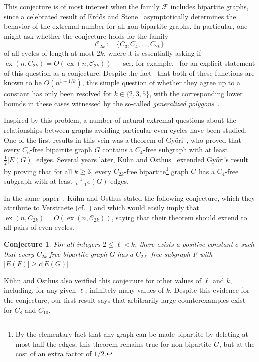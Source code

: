 \documentclass[A4paper,reqno,oneside,11pt]{amsart}
\theoremstyle{plain}
\newtheorem{conjecture}[theorem]{Conjecture}
\theoremstyle{definition}
\newcommand{\scC}{\mathscr{C}}
\newcommand{\scF}{\mathscr{F}}
\newcommand{\ex}{\operatorname{ex}}
\def\l{\ell}
\begin{document}
This conjecture is of most interest when the family $\scF$ includes bipartite graphs, since a celebrated result of Erd\H{o}s and Stone~\cite{ES46} asymptotically determines the behavior of the extremal number for all non-bipartite graphs. In particular, one might ask whether the conjecture holds for the family 
\begin{equation*}
    \scC_{2k} := \{C_3, C_4, \dots, C_{2k}\}
\end{equation*}
of all cycles of length at most $2k$, where it is essentially asking if $\ex(n, C_{2k}) = O(\ex(n, \scC_{2k}))$ --- see, for example,~\cite[Conjecture IV]{Verstraete} for an explicit statement of this question as a conjecture. Despite the fact~\cite{BS74} that both of these functions are known to be $O(n^{1 + 1/k})$, this simple question of whether they agree up to a constant has only been resolved for $k \in \{2,3,5\}$, with the corresponding lower bounds in these cases witnessed by the so-called {\it generalized polygons}~\cite{LUW99}.

Inspired by this problem, a number of natural extremal questions about the relationships between graphs avoiding particular even cycles have been studied. 
One of the first results in this vein was a theorem of Gy\H{o}ri~\cite{Gyori}, who proved that every $C_6$-free bipartite graph $G$ contains a $C_4$-free subgraph with at least $\frac 12 |E(G)|$ edges. 
Several years later, K\"uhn and Osthus~\cite{KO05} extended Gy\H{o}ri's result by proving that for all $k \geq 3$, every $C_{2k}$-free bipartite\footnote{By the elementary fact that any graph can be made bipartite by deleting at most half the edges, this theorem remains true for  non-bipartite $G$, but at the cost of an extra factor of $1/2$.} graph $G$ has a $C_4$-free subgraph with at least $\frac{1}{k-1} e(G)$ edges.

In the same paper~\cite{KO05}, K\"uhn and Osthus stated the following conjecture, which they attribute to Verstra\"ete (cf.~\cite[Conjecture VIII]{Verstraete}) and which would easily imply that $\ex(n, C_{2k}) = O(\ex(n, \scC_{2k}))$, 
saying that their theorem should extend to all pairs of even cycles.

\begin{conjecture}
\label{conj: main}
    For all integers $2 \leq \l< k$, there exists a positive constant $c$ such that every $C_{2k}$-free bipartite graph $G$ has a $C_{2\l}$-free subgraph $F$ with $|E(F)| \geq c|E(G)|$.
\end{conjecture}

K\"uhn and Osthus also verified this conjecture for other values of $\ell$ and $k$, including, for any given $\ell$, infinitely many values of $k$. 
Despite this evidence for the conjecture, our first result says that arbitrarily large counterexamples exist for $C_8$ and $C_{10}$.
\end{document}
